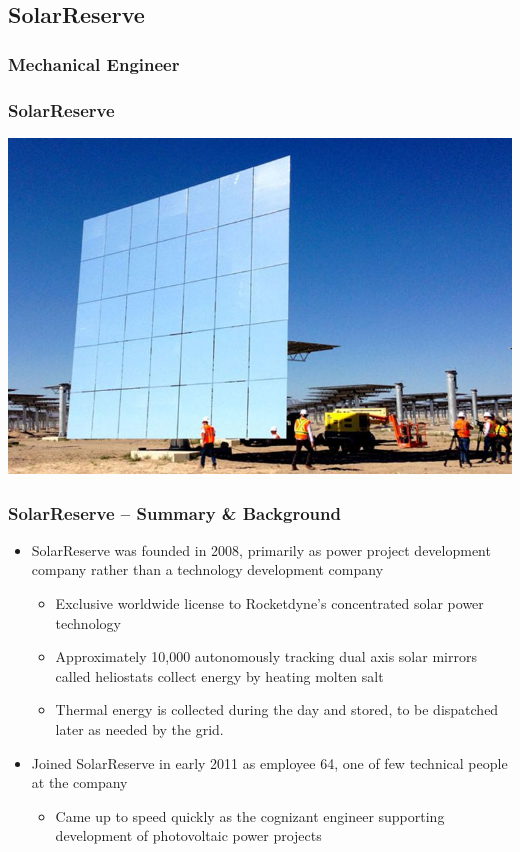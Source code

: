 \documentclass[aspectratio=169]{beamer}
\begin{document}
\subsection{SolarReserve}
\subsubsection{Mechanical Engineer}

\begin{frame}
  \frametitle{SolarReserve}
  \center
  \includegraphics[width=.7\linewidth]{HeliostatImage.jpeg}
\end{frame}

\begin{frame}
  \frametitle{SolarReserve -- Summary \& Background}
  \begin{itemize}
  \item SolarReserve was founded in 2008, primarily as power project
    development company rather than a technology development company
    \begin{itemize}
    \item Exclusive worldwide license to Rocketdyne's concentrated
      solar power technology
    \item Approximately 10,000 autonomously tracking dual axis solar
      mirrors called heliostats collect energy by heating molten
      salt
    \item Thermal energy is collected during the day and stored, to
      be dispatched later as needed by the grid.
    \end{itemize}
  \item Joined SolarReserve in early 2011 as employee 64, one
    of few technical people at the company
    \begin{itemize}
    \item Came up to speed quickly as the cognizant engineer
      supporting development of photovoltaic power projects
    \end{itemize}
  \end{itemize}
\end{frame}
\end{document}
